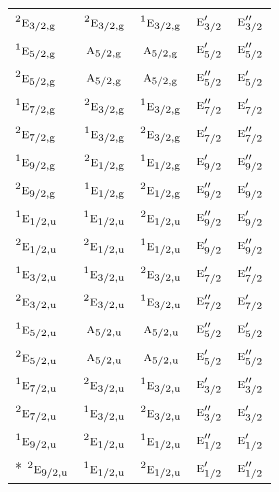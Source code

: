 \documentclass[10pt,a4paper]{article}
\numberwithin{equation}{section}
\newcommand{\irr}[1]{\text{\normalfont\scshape #1}}
\newcommand{\conjpair}[1]{{}^{#1}}
\newcommand{\ptag}[1]{\mathrm{#1}}
\begin{document}
{\begin{longtable}{@{}lcccc@{}}
$\conjpair{2}\irr{e}_{3/2,\ptag{g}}$ & $\conjpair{2}\irr{e}_{3/2,\ptag{g}}$ & $\conjpair{1}\irr{e}_{3/2,\ptag{g}}$ & $\irr{e}_{3/2}'$ & $\irr{e}_{3/2}''$\\
$\conjpair{1}\irr{e}_{5/2,\ptag{g}}$ & $\irr{a}_{5/2,\ptag{g}}$ & $\irr{a}_{5/2,\ptag{g}}$ & $\irr{e}_{5/2}'$ & $\irr{e}_{5/2}''$\\
$\conjpair{2}\irr{e}_{5/2,\ptag{g}}$ & $\irr{a}_{5/2,\ptag{g}}$ & $\irr{a}_{5/2,\ptag{g}}$ & $\irr{e}_{5/2}''$ & $\irr{e}_{5/2}'$\\
$\conjpair{1}\irr{e}_{7/2,\ptag{g}}$ & $\conjpair{2}\irr{e}_{3/2,\ptag{g}}$ & $\conjpair{1}\irr{e}_{3/2,\ptag{g}}$ & $\irr{e}_{7/2}''$ & $\irr{e}_{7/2}'$\\
$\conjpair{2}\irr{e}_{7/2,\ptag{g}}$ & $\conjpair{1}\irr{e}_{3/2,\ptag{g}}$ & $\conjpair{2}\irr{e}_{3/2,\ptag{g}}$ & $\irr{e}_{7/2}'$ & $\irr{e}_{7/2}''$\\
$\conjpair{1}\irr{e}_{9/2,\ptag{g}}$ & $\conjpair{2}\irr{e}_{1/2,\ptag{g}}$ & $\conjpair{1}\irr{e}_{1/2,\ptag{g}}$ & $\irr{e}_{9/2}'$ & $\irr{e}_{9/2}''$\\
$\conjpair{2}\irr{e}_{9/2,\ptag{g}}$ & $\conjpair{1}\irr{e}_{1/2,\ptag{g}}$ & $\conjpair{2}\irr{e}_{1/2,\ptag{g}}$ & $\irr{e}_{9/2}''$ & $\irr{e}_{9/2}'$\\
$\conjpair{1}\irr{e}_{1/2,\ptag{u}}$ & $\conjpair{1}\irr{e}_{1/2,\ptag{u}}$ & $\conjpair{2}\irr{e}_{1/2,\ptag{u}}$ & $\irr{e}_{9/2}''$ & $\irr{e}_{9/2}'$\\
$\conjpair{2}\irr{e}_{1/2,\ptag{u}}$ & $\conjpair{2}\irr{e}_{1/2,\ptag{u}}$ & $\conjpair{1}\irr{e}_{1/2,\ptag{u}}$ & $\irr{e}_{9/2}'$ & $\irr{e}_{9/2}''$\\
$\conjpair{1}\irr{e}_{3/2,\ptag{u}}$ & $\conjpair{1}\irr{e}_{3/2,\ptag{u}}$ & $\conjpair{2}\irr{e}_{3/2,\ptag{u}}$ & $\irr{e}_{7/2}'$ & $\irr{e}_{7/2}''$\\
$\conjpair{2}\irr{e}_{3/2,\ptag{u}}$ & $\conjpair{2}\irr{e}_{3/2,\ptag{u}}$ & $\conjpair{1}\irr{e}_{3/2,\ptag{u}}$ & $\irr{e}_{7/2}''$ & $\irr{e}_{7/2}'$\\
$\conjpair{1}\irr{e}_{5/2,\ptag{u}}$ & $\irr{a}_{5/2,\ptag{u}}$ & $\irr{a}_{5/2,\ptag{u}}$ & $\irr{e}_{5/2}''$ & $\irr{e}_{5/2}'$\\
$\conjpair{2}\irr{e}_{5/2,\ptag{u}}$ & $\irr{a}_{5/2,\ptag{u}}$ & $\irr{a}_{5/2,\ptag{u}}$ & $\irr{e}_{5/2}'$ & $\irr{e}_{5/2}''$\\
$\conjpair{1}\irr{e}_{7/2,\ptag{u}}$ & $\conjpair{2}\irr{e}_{3/2,\ptag{u}}$ & $\conjpair{1}\irr{e}_{3/2,\ptag{u}}$ & $\irr{e}_{3/2}'$ & $\irr{e}_{3/2}''$\\
$\conjpair{2}\irr{e}_{7/2,\ptag{u}}$ & $\conjpair{1}\irr{e}_{3/2,\ptag{u}}$ & $\conjpair{2}\irr{e}_{3/2,\ptag{u}}$ & $\irr{e}_{3/2}''$ & $\irr{e}_{3/2}'$\\
$\conjpair{1}\irr{e}_{9/2,\ptag{u}}$ & $\conjpair{2}\irr{e}_{1/2,\ptag{u}}$ & $\conjpair{1}\irr{e}_{1/2,\ptag{u}}$ & $\irr{e}_{1/2}''$ & $\irr{e}_{1/2}'$\\*
$\conjpair{2}\irr{e}_{9/2,\ptag{u}}$ & $\conjpair{1}\irr{e}_{1/2,\ptag{u}}$ & $\conjpair{2}\irr{e}_{1/2,\ptag{u}}$ & $\irr{e}_{1/2}'$ & $\irr{e}_{1/2}''$\\
\bottomrule\end{longtable}}
\end{document}
